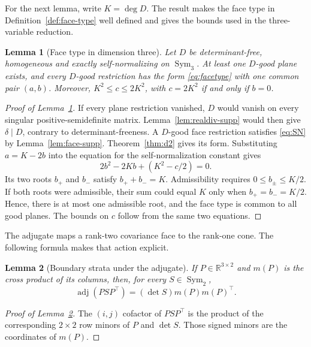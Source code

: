 \documentclass[12pt,a4paper]{article}
\theoremstyle{plain}
\newtheorem{lemma}{Lemma}
\theoremstyle{definition}
\newcommand{\R}{\mathbb{R}}
\newcommand{\Sym}{\operatorname{Sym}}
\newcommand{\adjm}{\operatorname{adj}}
\begin{document}
For the next lemma, write $K=\deg D$.
The result makes the face type in Definition~\ref{def:face-type} well defined and gives the bounds used in the three-variable reduction.

\begin{lemma}[Face type in dimension three]
\label{lem:facetype-supp}
    Let $D$ be determinant-free, homogeneous and exactly self-normalizing on $\Sym_3$.
    At least one $D$-good plane exists, and every $D$-good restriction has the form \eqref{eq:facetype} with one common pair $(a,b)$.
    Moreover, $K^2\le c\le2K^2$, with $c=2K^2$ if and only if $b=0$.
\end{lemma}

\begin{proof}[Proof of Lemma~\ref{lem:facetype-supp}]
    If every plane restriction vanished, $D$ would vanish on every singular positive-semidefinite matrix.
    Lemma~\ref{lem:realdiv-supp} would then give $\delta\mid D$, contrary to determinant-freeness.
    A $D$-good face restriction satisfies \eqref{eq:SN} by Lemma~\ref{lem:face-supp}.
    Theorem~\ref{thm:d2} gives its form.
    Substituting $a=K-2b$ into the equation for the self-normalization constant gives
    \begin{equation*}
        2b^2-2Kb+(K^2-c/2)=0
        .
    \end{equation*}
    Its two roots $b_+$ and $b_-$ satisfy $b_++b_-=K$.
    Admissibility requires $0\le b_\pm\le K/2$.
    If both roots were admissible, their sum could equal $K$ only when $b_+=b_-=K/2$.
    Hence, there is at most one admissible root, and the face type is common to all good planes.
    The bounds on $c$ follow from the same two equations.
\end{proof}

The adjugate maps a rank-two covariance face to the rank-one cone.
The following formula makes that action explicit.

\begin{lemma}[Boundary strata under the adjugate]
\label{lem:strata-supp}
    If $P\in\R^{3\times2}$ and $m(P)$ is the cross product of its columns, then, for every $S\in\Sym_2$,
    \begin{equation*}
        \adjm(PSP^\top)
        =
        (\det S)m(P)m(P)^\top
        .
    \end{equation*}
\end{lemma}

\begin{proof}[Proof of Lemma~\ref{lem:strata-supp}]
    The $(i,j)$ cofactor of $PSP^\top$ is the product of the corresponding $2\times2$ row minors of $P$ and $\det S$.
    Those signed minors are the coordinates of $m(P)$.
\end{proof}
\end{document}
